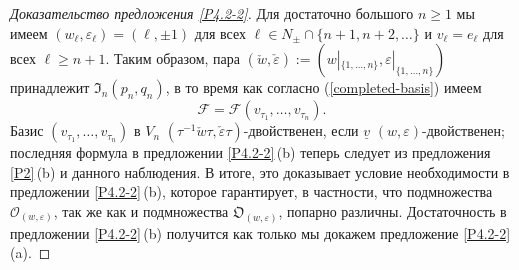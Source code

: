 \documentclass{amsart}
\theoremstyle{definition}
\newcommand{\bs}[1]{\boldsymbol{#1}}
\begin{document}
\begin{proof}[Доказательство предложения \ref{P4.2-2}]
Для достаточно большого $n\geq 1$  мы имеем
$(w_\ell,\varepsilon_\ell)=(\ell,\pm1)$ для всех $\ell\in N_\pm\cap\{n+1,n+2,\ldots\}$
и $v_\ell=e_\ell$ для всех $\ell\geq n+1$.
Таким образом, пара $(\check{w},\check{\varepsilon}):=(w|_{\{1,\ldots,n\}},\varepsilon|_{\{1,\ldots,n\}})$ принадлежит $\mathfrak{I}_n(p_n,q_n)$, в то время как согласно (\ref{completed-basis})  имеем
\[\mathcal{F}=\mathcal{F}(v_{\tau_1},\ldots,v_{\tau_n}).\]
Базис $(v_{\tau_1},\ldots,v_{\tau_n})$ в $V_n$  $(\tau^{-1}\check{w}\tau,\check{\varepsilon}\tau)$-двойственен, если $\underline{v}$  $(w,\varepsilon)$-двойственен; последняя формула в предложении \ref{P4.2-2}\,{\rm (b)} теперь следует из предложения \ref{P2}\,{\rm (b)} и данного наблюдения. В итоге, это доказывает условие необходимости в предложении \ref{P4.2-2}\,{\rm (b)}, которое гарантирует, в частности, что подмножества $\bs{\mathcal{O}}_{(w,\varepsilon)}$, так же как и подмножества $\bs{\mathfrak{O}}_{(w,\varepsilon)}$,
попарно различны.
Достаточность в предложении \ref{P4.2-2}\,{\rm (b)} получится как только мы докажем
предложение \ref{P4.2-2}\,{\rm (a)}.


\end{proof}
\end{document}
